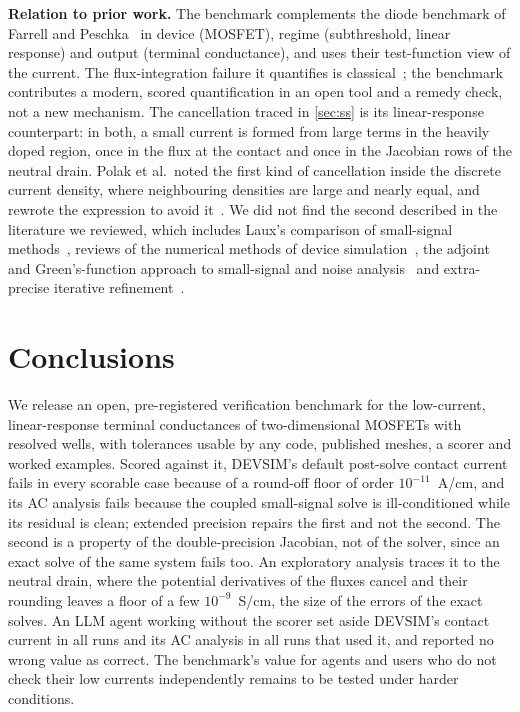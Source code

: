 \documentclass[11pt]{article}
\begin{document}
\textbf{Relation to prior work.} The benchmark complements the diode benchmark of Farrell and Peschka~\cite{FarrellPeschka2019}
in device (MOSFET), regime (subthreshold, linear response) and output (terminal conductance), and uses their test-function
view of the current. The flux-integration failure it quantifies is classical~\cite{PalmVandeWiele1985}; the benchmark
contributes a modern, scored quantification in an open tool and a remedy check, not a new mechanism. The cancellation
traced in \cref{sec:ss} is its linear-response counterpart: in both, a small current is formed from large terms in the
heavily doped region, once in the flux at the contact and once in the Jacobian rows of the neutral drain. Polak et al.\
noted the first kind of cancellation inside the discrete current density, where neighbouring densities are large and
nearly equal, and rewrote the expression to avoid it~\cite{Polak1987}. We did not find the second described in the
literature we reviewed, which includes Laux's comparison of small-signal methods~\cite{Laux1985}, reviews of the
numerical methods of device simulation~\cite{BankRoseFichtner1983,Polak1987,Selberherr1984}, the adjoint and
Green's-function approach to small-signal and noise analysis~\cite{GhioneFilicori1993,Bonani2003} and extra-precise
iterative refinement~\cite{Demmel2006}.

\section{Conclusions}
We release an open, pre-registered verification benchmark for the low-current, linear-response terminal conductances of
two-dimensional MOSFETs with resolved wells, with tolerances usable by any code, published meshes, a scorer and worked
examples. Scored against it, DEVSIM's default post-solve contact current fails in every scorable case because of a
round-off floor of order $10^{-11}$~A/cm, and its AC analysis fails because the coupled small-signal solve is ill-conditioned
while its residual is clean; extended precision repairs the first and not the second. The second is a property of the
double-precision Jacobian, not of the solver, since an exact solve of the same system fails too. An exploratory analysis
traces it to the neutral drain, where the potential derivatives of the fluxes cancel and their rounding leaves a floor of
a few $10^{-9}$~S/cm, the size of the errors of the exact solves. An LLM agent working without the
scorer set aside DEVSIM's contact current in all \agentRuns{} runs and its AC analysis in all \agentCalledAC{} runs that
used it, and reported no wrong value as correct. The benchmark's value for
agents and users who do not check their low currents independently remains to be tested under harder conditions.
\end{document}
